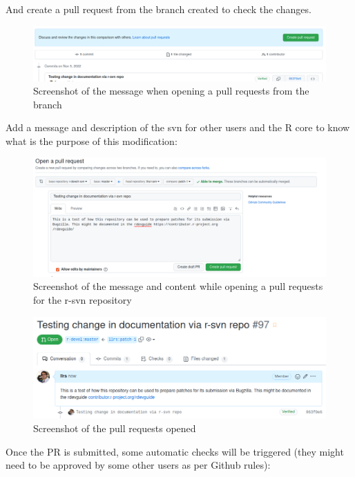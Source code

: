 \documentclass[
]{book}
\begin{document}
And create a pull request from the branch created to check the changes.

\begin{figure}
\centering
\includegraphics{img/rsvn_commit_pre_PR.png}
\caption{Screenshot of the message when opening a pull requests from the branch}
\end{figure}

Add a message and description of the svn for other users and the R core to know what is the purpose of this modification:

\begin{figure}
\centering
\includegraphics{img/rsvn_PR_message.png}
\caption{Screenshot of the message and content while opening a pull requests for the r-svn repository}
\end{figure}

\begin{figure}
\centering
\includegraphics{img/rsvn_PR_created.png}
\caption{Screenshot of the pull requests opened}
\end{figure}

Once the PR is submitted, some automatic checks will be triggered (they might need to be approved by some other users as per Github rules):
\end{document}

